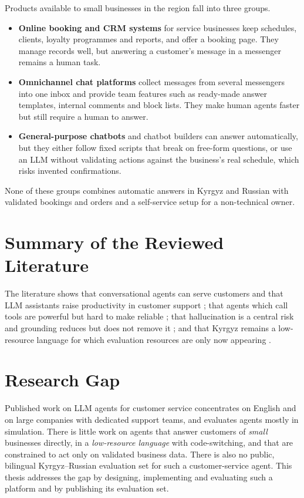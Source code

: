 Products available to small businesses in the region fall into three groups.
\begin{itemize}
	\item \textbf{Online booking and CRM systems} for service businesses keep schedules, clients, loyalty programmes and
	reports, and offer a booking page. They manage records well, but answering a customer's message in a messenger
	remains a human task.
	\item \textbf{Omnichannel chat platforms} collect messages from several messengers into one inbox and provide team
	features such as ready-made answer templates, internal comments and block lists. They make human agents faster but
	still require a human to answer.
	\item \textbf{General-purpose chatbots} and chatbot builders can answer automatically, but they either follow fixed
	scripts that break on free-form questions, or use an LLM without validating actions against the business's real
	schedule, which risks invented confirmations.
\end{itemize}
None of these groups combines automatic answers in Kyrgyz and Russian with validated bookings and orders and a
self-service setup for a non-technical owner.

\section{Summary of the Reviewed Literature}

The literature shows that conversational agents can serve customers and that LLM assistants raise productivity in
customer support \parencite{brynjolfsson2025generative}; that agents which call tools are powerful but hard to make
reliable \parencite{yao2023react, yao2024taubench}; that hallucination is a central risk and grounding reduces but does not
remove it \parencite{ji2023survey, lewis2020retrieval}; and that Kyrgyz remains a low-resource language for which
evaluation resources are only now appearing \parencite{alekseev2024kyrgyznlp, turatali2026kyrgyzllmbench}.

\section{Research Gap}

Published work on LLM agents for customer service concentrates on English and on large companies with dedicated support
teams, and evaluates agents mostly in simulation. There is little work on agents that answer customers of
\emph{small} businesses directly, in a \emph{low-resource language} with code-switching, and that are constrained to
act only on validated business data. There is also no public, bilingual Kyrgyz--Russian evaluation set for such a
customer-service agent. This thesis addresses the gap by designing, implementing and evaluating such a platform and by
publishing its evaluation set.
